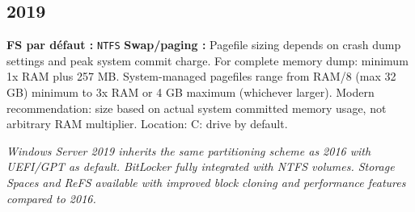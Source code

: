 \documentclass[10pt,a4paper]{article}
\begin{document}
\subsection{2019}
\noindent\small \textbf{FS par d\'efaut :} \texttt{NTFS} \quad\textbullet\quad \textbf{Swap/paging :} Pagefile sizing depends on crash dump settings and peak system commit charge. For complete memory dump: minimum 1x RAM plus 257 MB. System-managed pagefiles range from RAM/8 (max 32 GB) minimum to 3x RAM or 4 GB maximum (whichever larger). Modern recommendation: size based on actual system committed memory usage, not arbitrary RAM multiplier. Location: C: drive by default.\normalsize\par\smallskip
\noindent\small\textit{Windows Server 2019 inherits the same partitioning scheme as 2016 with UEFI/GPT as default. BitLocker fully integrated with NTFS volumes. Storage Spaces and ReFS available with improved block cloning and performance features compared to 2016.}\normalsize\par\smallskip
\end{document}
